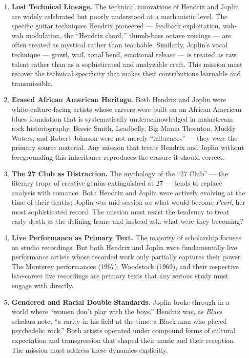 \documentclass[11pt,letterpaper]{article}
\begin{document}
\begin{enumerate}[leftmargin=*, label=\textbf{\arabic*.}]

\item \textbf{Lost Technical Lineage.} The technical innovations of Hendrix and Joplin are widely celebrated but poorly understood at a mechanistic level. The specific guitar techniques Hendrix pioneered --- feedback exploitation, wah-wah modulation, the ``Hendrix chord,'' thumb-bass octave voicings --- are often treated as mystical rather than teachable. Similarly, Joplin's vocal technique --- growl, wail, tonal bend, emotional release --- is treated as raw talent rather than as a sophisticated and analyzable craft. This mission must recover the technical specificity that makes their contributions learnable and transmissible.

\item \textbf{Erased African American Heritage.} Both Hendrix and Joplin were white-culture-facing artists whose careers were built on an African American blues foundation that is systematically underacknowledged in mainstream rock historiography. Bessie Smith, Leadbelly, Big Mama Thornton, Muddy Waters, and Robert Johnson were not merely ``influences'' --- they were the primary source material. Any mission that treats Hendrix and Joplin without foregrounding this inheritance reproduces the erasure it should correct.

\item \textbf{The 27 Club as Distraction.} The mythology of the ``27 Club'' --- the literary trope of creative genius extinguished at 27 --- tends to replace analysis with romance. Both Hendrix and Joplin were actively evolving at the time of their deaths; Joplin was mid-session on what would become \textit{Pearl}, her most sophisticated record. The mission must resist the tendency to treat early death as the defining frame and instead ask: what were they becoming?

\item \textbf{Live Performance as Primary Text.} The majority of scholarship focuses on studio recordings. But both Hendrix and Joplin were fundamentally live performance artists whose recorded work only partially captures their power. The Monterey performances (1967), Woodstock (1969), and their respective late-career live recordings are primary texts that any serious study must engage with directly.

\item \textbf{Gendered and Racial Double Standards.} Joplin broke through in a world where ``women don't play with the boys.'' Hendrix was, as \textit{Blues} scholars note, ``a rarity in his field at the time: a Black man who played psychedelic rock.'' Both artists operated under compound forms of cultural expectation and transgression that shaped their music and their reception. The mission must address these dynamics explicitly.

\end{enumerate}
\end{document}
